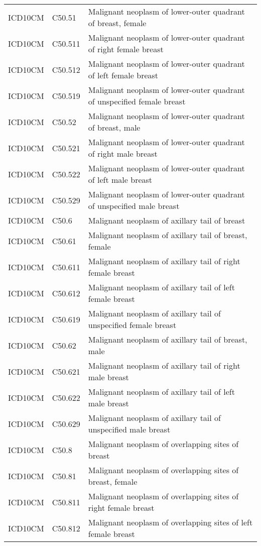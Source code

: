 \begin{longtable}{p{}p{}p{}}
  ICD10CM & C50.51 & Malignant neoplasm of lower-outer quadrant of breast, female \\ 
  ICD10CM & C50.511 & Malignant neoplasm of lower-outer quadrant of right female breast \\ 
  ICD10CM & C50.512 & Malignant neoplasm of lower-outer quadrant of left female breast \\ 
  ICD10CM & C50.519 & Malignant neoplasm of lower-outer quadrant of unspecified female breast \\ 
  ICD10CM & C50.52 & Malignant neoplasm of lower-outer quadrant of breast, male \\ 
  ICD10CM & C50.521 & Malignant neoplasm of lower-outer quadrant of right male breast \\ 
  ICD10CM & C50.522 & Malignant neoplasm of lower-outer quadrant of left male breast \\ 
  ICD10CM & C50.529 & Malignant neoplasm of lower-outer quadrant of unspecified male breast \\ 
  ICD10CM & C50.6 & Malignant neoplasm of axillary tail of breast \\ 
  ICD10CM & C50.61 & Malignant neoplasm of axillary tail of breast, female \\ 
  ICD10CM & C50.611 & Malignant neoplasm of axillary tail of right female breast \\ 
  ICD10CM & C50.612 & Malignant neoplasm of axillary tail of left female breast \\ 
  ICD10CM & C50.619 & Malignant neoplasm of axillary tail of unspecified female breast \\ 
  ICD10CM & C50.62 & Malignant neoplasm of axillary tail of breast, male \\ 
  ICD10CM & C50.621 & Malignant neoplasm of axillary tail of right male breast \\ 
  ICD10CM & C50.622 & Malignant neoplasm of axillary tail of left male breast \\ 
  ICD10CM & C50.629 & Malignant neoplasm of axillary tail of unspecified male breast \\ 
  ICD10CM & C50.8 & Malignant neoplasm of overlapping sites of breast \\ 
  ICD10CM & C50.81 & Malignant neoplasm of overlapping sites of breast, female \\ 
  ICD10CM & C50.811 & Malignant neoplasm of overlapping sites of right female breast \\ 
  ICD10CM & C50.812 & Malignant neoplasm of overlapping sites of left female breast \\ 

\end{longtable}
